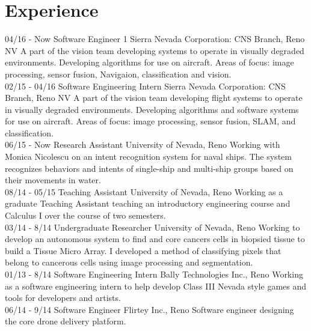 \documentclass[]{friggeri-cv}
\begin{document}
\section{Experience}
\begin{entrylist}
  \entry
    {04/16 - Now}
    {Software Engineer 1}
    {Sierra Nevada Corporation: CNS Branch, Reno NV}
    {A part of the vision team developing systems to operate in visually degraded environments. Developing algorithms for use on aircraft. Areas of focus: image processing, sensor fusion, Navigaion, classification and vision.\\}
  \entry
    {02/15 - 04/16}
    {Software Engineering Intern}
    {Sierra Nevada Corporation: CNS Branch, Reno NV}
    {A part of the vision team developing flight systems to operate in visually degraded environments. Developing algorithms and software systems for use on aircraft. Areas of focus: image processing, sensor fusion, SLAM, and classification.\\}
  \entry
    {06/15 - Now}
    {Research Assistant}
    {University of Nevada, Reno}
    {Working with Monica Nicolescu on an intent recognition system for naval ships. The system recognizes behaviors and intents of single-ship and multi-ship groups based on their movements in water.\\}
  \entry
    {08/14 - 05/15}
    {Teaching Assistant}
    {University of Nevada, Reno}
    {Working as a graduate Teaching Assistant teaching an introductory engineering course and Calculus I over the course of two semesters.\\}
  \entry
    {03/14 - 8/14}
    {Undergraduate Researcher}
    {University of Nevada, Reno}
    {Working to develop an autonomous system to find and core cancers cells in biopsied tissue to build a Tissue Micro Array. I developed a method of classifying pixels that belong to cancerous cells using image processing and segmentation.\\}
    \entry
    {01/13 - 8/14}
    {Software Engineering Intern}
    {Bally Technologies Inc., Reno}
    {Working as a software engineering intern to help develop Class III Nevada style games and tools for developers and artists.\\}
    \entry
    {06/14 - 9/14}
    {Software Engineer}
    {Flirtey Inc., Reno}
    {Software engineer designing the core drone delivery platform.\\}
\end{entrylist}
\end{document}
